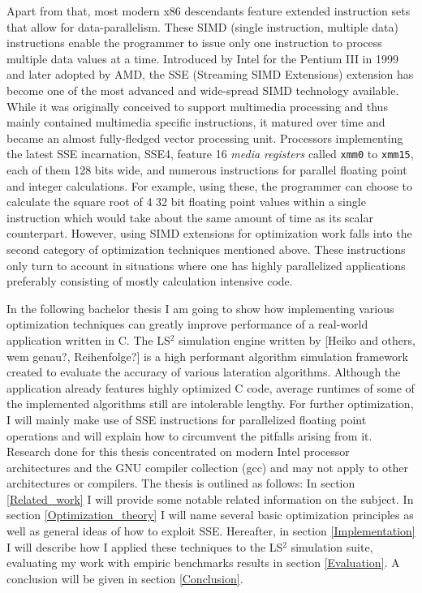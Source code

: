 Apart from that, most modern x86 descendants feature extended instruction sets that allow for data-parallelism. These SIMD (single instruction, multiple data) instructions enable the programmer to issue only one instruction to process multiple data values at a time. Introduced by Intel for the Pentium III in 1999 and later adopted by AMD, the SSE (Streaming SIMD Extensions) extension has become one of the most advanced and wide-spread SIMD technology available. While it was originally conceived to support multimedia processing and thus mainly contained multimedia specific instructions, it matured over time and became an almost fully-fledged vector processing unit. Processors implementing the latest SSE incarnation, SSE4, feature 16 \emph{media registers} called \texttt{xmm0} to \texttt{xmm15}, each of them 128 bits wide, and numerous instructions for parallel floating point and integer calculations. For example, using these, the programmer can choose to calculate the square root of 4 32 bit floating point values within a single instruction which would take about the same amount of time as its scalar counterpart. However, using SIMD extensions for optimization work falls into the second category of optimization techniques mentioned above. These instructions only turn to account in situations where one has highly parallelized applications preferably consisting of mostly calculation intensive code.

In the following bachelor thesis I am going to show how implementing various optimization techniques can greatly improve performance of a real-world application written in C. The LS$^{2}$ simulation engine written by [Heiko and others, wem genau?, Reihenfolge?] is a high performant algorithm simulation framework created to evaluate the accuracy of various lateration algorithms. Although the application already features highly optimized C code, average runtimes of some of the implemented algorithms still are intolerable lengthy. For further optimization, I will mainly make use of SSE instructions for parallelized floating point operations and will explain how to circumvent the pitfalls arising from it. Research done for this thesis concentrated on modern Intel processor architectures and the GNU compiler collection (gcc) and may not apply to other architectures or compilers. The thesis is outlined as follows: In section \ref{Related_work} I will provide some notable related information on the subject. In section \ref{Optimization_theory} I will name several basic optimization principles as well as general ideas of how to exploit SSE. Hereafter, in section \ref{Implementation} I will describe how I applied these techniques to the LS$^{2}$ simulation suite, evaluating my work with empiric benchmarks results in section \ref{Evaluation}. A conclusion will be given in section \ref{Conclusion}.
